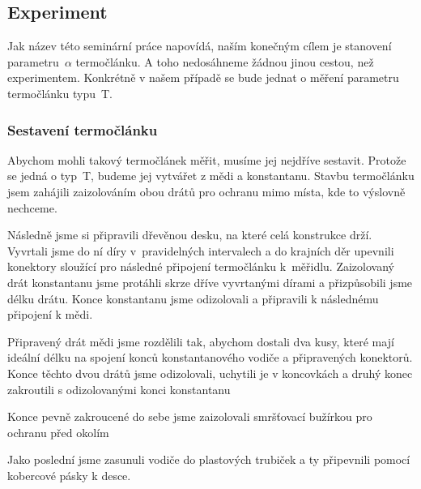 \subsection{Experiment}
Jak název této seminární práce napovídá, naším konečným cílem je stanovení
parametru~$\alpha$ termočlánku. A toho nedosáhneme žádnou jinou cestou, než
experimentem. Konkrétně v našem případě se bude jednat o měření parametru
termočlánku typu~T.

\subsubsection{Sestavení termočlánku}
Abychom mohli takový termočlánek měřit, musíme jej nejdříve sestavit. Protože
se jedná o typ~T, budeme jej vytvářet z mědi a konstantanu. Stavbu termočlánku
jsem zahájili zaizolováním obou drátů pro ochranu mimo místa, kde to výslovně
nechceme.

Následně jsme si připravili dřevěnou desku, na které celá konstrukce drží.
Vyvrtali jsme do ní díry v~pravidelných intervalech a do krajních děr upevnili
konektory sloužící pro následné připojení termočlánku k~měřidlu.
Zaizolovaný drát konstantanu jsme protáhli skrze dříve vyvrtanými dírami 
a přizpůsobili jsme délku drátu. Konce konstantanu jsme odizolovali a připravili
k následnému připojení k mědi.

Připravený drát mědi jsme rozdělili tak, abychom dostali dva kusy, které mají
ideální délku na spojení konců konstantanového vodiče a připravených konektorů.
Konce těchto dvou drátů jsme odizolovali, uchytili je v koncovkách a druhý konec
zakroutili s odizolovanými konci konstantanu%

Konce pevně zakroucené do sebe jsme zaizolovali smršťovací bužírkou pro ochranu
před okolím

Jako poslední jsme zasunuli vodiče do plastových trubiček a ty připevnili
pomocí kobercové pásky k desce.
